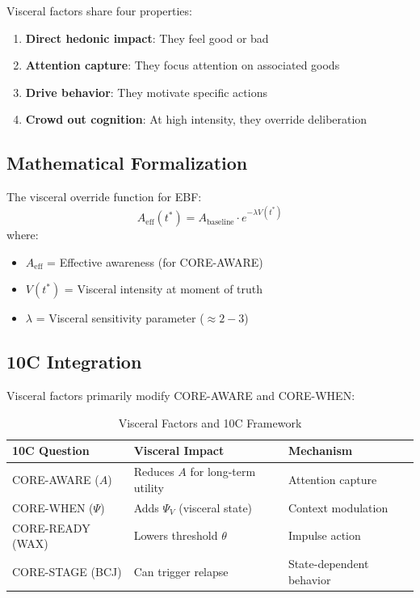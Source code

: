 Visceral factors share four properties:
\begin{enumerate}[nosep]
\item \textbf{Direct hedonic impact}: They feel good or bad
\item \textbf{Attention capture}: They focus attention on associated goods
\item \textbf{Drive behavior}: They motivate specific actions
\item \textbf{Crowd out cognition}: At high intensity, they override deliberation
\end{enumerate}

\subsection{Mathematical Formalization}

The visceral override function for EBF:
\begin{equation}
A_{\text{eff}}(t^*) = A_{\text{baseline}} \cdot e^{-\lambda V(t^*)}
\end{equation}
where:
\begin{itemize}[nosep]
\item $A_{\text{eff}}$ = Effective awareness (for CORE-AWARE)
\item $V(t^*)$ = Visceral intensity at moment of truth
\item $\lambda$ = Visceral sensitivity parameter ($\approx 2-3$)
\end{itemize}

\subsection{10C Integration}

Visceral factors primarily modify CORE-AWARE and CORE-WHEN:

\begin{table}[htbp]
\centering
\caption{Visceral Factors and 10C Framework}
\label{tab:lo-9c}
\renewcommand{\arraystretch}{1.3}
\begin{tabular}{@{}lll@{}}
\toprule
\textbf{10C Question} & \textbf{Visceral Impact} & \textbf{Mechanism} \\
\midrule
CORE-AWARE ($A$) & Reduces $A$ for long-term utility & Attention capture \\
CORE-WHEN ($\Psi$) & Adds $\Psi_V$ (visceral state) & Context modulation \\
CORE-READY (WAX) & Lowers threshold $\theta$ & Impulse action \\
CORE-STAGE (BCJ) & Can trigger relapse & State-dependent behavior \\
\bottomrule
\end{tabular}
\end{table}


